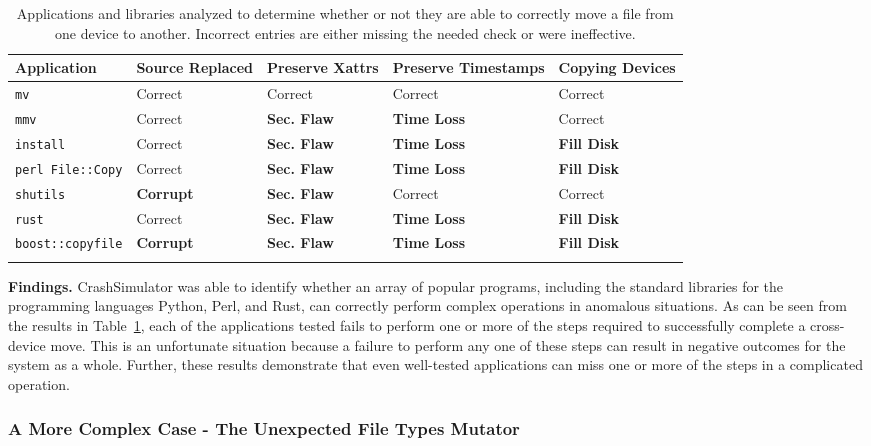  \begin{table}[t]
    \scriptsize{}
    \begin{tabular}{l p{1cm} p{1cm} p{1.2cm} p{1cm}}
    \toprule{}
        Application     & Source Replaced & Preserve Xattrs & Preserve Timestamps & Copying Devices\\
\hline
        {\tt mv}              & Correct             & Correct         & Correct             & Correct\\
        {\tt mmv}             & Correct             & {\bf Sec. Flaw} & {\bf Time Loss} & Correct\\
        {\tt install}         & Correct             & {\bf Sec. Flaw} & {\bf Time Loss} & {\bf Fill Disk} \\
        {\tt perl File::Copy} & Correct             & {\bf Sec. Flaw} & {\bf Time Loss} & {\bf Fill Disk} \\
        {\tt shutils}         & {\bf Corrupt}	& {\bf Sec. Flaw} 	& Correct             & Correct\\
        {\tt rust}             & Correct             & {\bf Sec. Flaw} & {\bf Time Loss} & {\bf Fill Disk} \\
        {\tt boost::copyfile} & {\bf Corrupt}	      & {\bf Sec. Flaw} & {\bf Time Loss} & {\bf Fill Disk} \\
    \bottomrule{}
    \end{tabular}
    \caption{Applications and libraries analyzed to determine whether or not
      they are able to correctly move a file from one device to another.
Incorrect entries are either missing the needed check or were ineffective.}
    \label{table:crossdevice}
\end{table}

{\bf Findings.}
CrashSimulator was able to identify whether an array of popular programs,
including the standard libraries for the programming languages Python,
Perl,
and Rust,
can correctly perform complex
operations in anomalous situations.
As can be seen from the results in Table~\ref{table:crossdevice}, each of the
applications tested fails to perform one or more of the steps required to
successfully complete a cross-device move.  This is an unfortunate situation
because a failure to perform any one of these steps can result in negative
outcomes for the system as a whole.
Further, these results demonstrate that even well-tested applications
can miss one or more of the steps in a complicated operation.

\subsubsection{A More Complex Case - The Unexpected File Types Mutator}
\label{sec-file-type-bugs}

